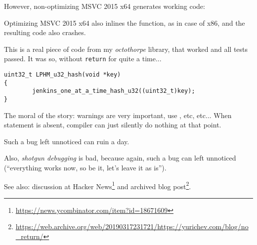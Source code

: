 

However, non-optimizing MSVC 2015 x64 generates working code:



Optimizing MSVC 2015 x64 also inlines the function, as in case of x86, and the resulting code also crashes.

\myhrule{}

This is a real piece of code from my \emph{octothorpe} library, that worked and all tests passed.
It was so, without \verb|return| for quite a time...

\begin{lstlisting}
uint32_t LPHM_u32_hash(void *key)
{
        jenkins_one_at_a_time_hash_u32((uint32_t)key);
}
\end{lstlisting}

\myhrule{}

The moral of the story: warnings are very important, use , etc, etc...
When  statement is absent, compiler can just silently do nothing at that point.

Such a bug left unnoticed can ruin a day.

Also, \emph{shotgun debugging}
is bad, because again, such a bug can left unnoticed (``everything works now, so be it, let's leave it as is'').

See also: discussion at Hacker News\footnote{\url{https://news.ycombinator.com/item?id=18671609}}
and archived blog post\footnote{\url{https://web.archive.org/web/20190317231721/https://yurichev.com/blog/no_return/}}.

